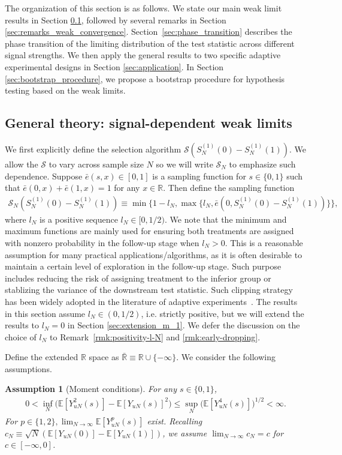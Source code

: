 \documentclass[12pt]{article}
\newtheorem{assumption}{Assumption}
\newcommand{\E}{\mathbb E}								%
\begin{document}
The organization of this section is as follows. We state our main weak limit results in Section \ref{sec:weak_convergence}, followed by several remarks in Section \ref{sec:remarks_weak_convergence}. 
Section~\ref{sec:phase_transition} describes the phase transition of the limiting distribution of the test statistic across different signal strengths.
We then apply the general results to two specific adaptive experimental designs in Section \ref{sec:application}. In Section \ref{sec:bootstrap_procedure}, we propose a bootstrap procedure for hypothesis testing based on the weak limits. 

\subsection{General theory: signal-dependent weak limits}\label{sec:weak_convergence}

We first explicitly define the selection algorithm $\mathcal{S}(S_N^{(1)}(0)-S_N^{(1)}(1))$. We allow the $\mathcal{S}$ to vary across sample size $N$ so we will write $\mathcal{S}_N$ to emphasize such dependence. Suppose $\bar e(s,x)\in[0,1]$ is a sampling function for $s\in\{0,1\}$ such that $\bar e(0,x)+\bar e(1,x)=1$ for any $x\in\mathbb{R}$. Then define the sampling function
\begin{align}\label{eq:clip}
	\mathcal{S}_N(S_N^{(1)}(0) - S_N^{(1)}(1))\equiv \min\{1-l_N, \max\{l_N,\bar e(0,S_N^{(1)}(0)-S_N^{(1)}(1))\}\},
\end{align}
where $l_N$ is a positive sequence $l_N\in[0,1/2)$. 
We note that the minimum and maximum functions are mainly used for ensuring both treatments are assigned with nonzero probability in the follow-up stage when $l_N>0$. This is a reasonable assumption for many practical applications/algorithms, as it is often desirable to maintain a certain level of exploration in the follow-up stage. Such purpose includes reducing the risk of assigning treatment to the inferior group or stablizing the variance of the downstream test statistic. Such clipping strategy has been widely adopted in the literature of adaptive experiments~\citep{Zhang2020,Hadad2021}. The results in this section assume $l_N\in(0,1/2)$, i.e. strictly positive, but we will extend the results to $l_N=0$ in Section \ref{sec:extension_m_1}. We defer the discussion on the choice of $l_N$ to Remark~\ref{rmk:positivity-l-N} and \ref{rmk:early-dropping}. 

Define the extended $\mathbb{R}$ space as $\bar{\mathbb{R}}\equiv \mathbb{R}\cup \{-\infty\}$. We consider the following assumptions.
\begin{assumption}[Moment conditions]\label{assu:moment_condition}
	For any $s\in\{0,1\}$,
	\begin{align*}
		0< \inf_{N}\big(\E\left[Y_{uN}^2(s)\right]-\E\left[Y_{uN}(s)\right]^2\big)
		\leq \sup_{N}\big(\E\left[Y_{uN}^4(s)\right]\big)^{1/2}<\infty.
	\end{align*}
	For $p\in\{1,2\}, \lim_{N\rightarrow\infty}\E[Y_{uN}^{p}(s)]$ exist. Recalling $c_N\equiv \sqrt{N}(\E[Y_{uN}(0)]-\E[Y_{uN}(1)])$, we assume $\lim_{N\rightarrow\infty}c_N=c$ for $c\in[-\infty,0]$. 
\end{assumption}
\end{document}
